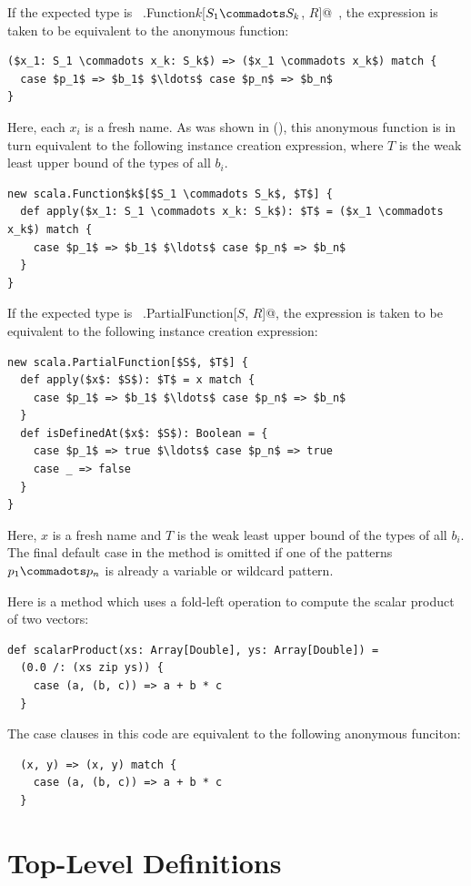 If the expected type is ~\lstinline@scala.Function$k$[$S_1 \commadots S_k$, $R$]@~,
the expression is taken to be equivalent to the anonymous function:
\begin{lstlisting}
($x_1: S_1 \commadots x_k: S_k$) => ($x_1 \commadots x_k$) match { 
  case $p_1$ => $b_1$ $\ldots$ case $p_n$ => $b_n$ 
}
\end{lstlisting}
Here, each $x_i$ is a fresh name.
As was shown in (), this anonymous function is in turn
equivalent to the following instance creation expression, where
 $T$ is the weak least upper bound of the types of all $b_i$.
\begin{lstlisting}
new scala.Function$k$[$S_1 \commadots S_k$, $T$] {
  def apply($x_1: S_1 \commadots x_k: S_k$): $T$ = ($x_1 \commadots x_k$) match {
    case $p_1$ => $b_1$ $\ldots$ case $p_n$ => $b_n$
  }
}
\end{lstlisting}
If the expected type is ~\lstinline@scala.PartialFunction[$S$, $R$]@,
the expression is taken to be equivalent to the following instance creation expression:
\begin{lstlisting}
new scala.PartialFunction[$S$, $T$] {
  def apply($x$: $S$): $T$ = x match {
    case $p_1$ => $b_1$ $\ldots$ case $p_n$ => $b_n$
  }
  def isDefinedAt($x$: $S$): Boolean = {
    case $p_1$ => true $\ldots$ case $p_n$ => true
    case _ => false
  }
}
\end{lstlisting}
Here, $x$ is a fresh name and $T$ is the weak least upper bound of the
types of all $b_i$. The final default case in the 
method is omitted if one of the patterns $p_1 \commadots p_n$ is
already a variable or wildcard pattern.

\example Here is a method which uses a fold-left operation
\code{/:} to compute the scalar product of 
two vectors:
\begin{lstlisting}
def scalarProduct(xs: Array[Double], ys: Array[Double]) = 
  (0.0 /: (xs zip ys)) {
    case (a, (b, c)) => a + b * c
  }
\end{lstlisting}
The case clauses in this code are equivalent to the following
anonymous funciton:
\begin{lstlisting}
  (x, y) => (x, y) match {
    case (a, (b, c)) => a + b * c
  }
\end{lstlisting}

\chapter{Top-Level Definitions}
\label{sec:topdefs}

